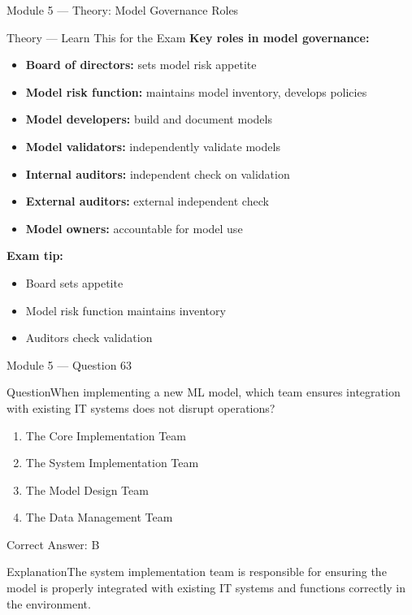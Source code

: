 \documentclass[aspectratio=169,10pt]{beamer}
\newcommand{\question}[1]{\begin{block}{Question}#1\end{block}}
\newcommand{\options}[4]{%
	\begin{enumerate}[label=\Alph*.,leftmargin=*]
		\item #1
		\item #2
		\item #3
		\item #4
	\end{enumerate}
}
\newcommand{\answerbox}[1]{\begin{exampleblock}{Correct Answer: #1}\end{exampleblock}}
\newcommand{\explain}[1]{\begin{block}{Explanation}#1\end{block}}
\newcommand{\theory}[1]{%
	\begin{block}{Theory --- Learn This for the Exam}
		\small #1
	\end{block}
}
\begin{document}
	\begin{frame}{Module 5 --- Theory: Model Governance Roles}
		\theory{
			\textbf{Key roles in model governance:}
			\begin{itemize}
				\item \textbf{Board of directors:} sets model risk appetite
				\item \textbf{Model risk function:} maintains model inventory, develops policies
				\item \textbf{Model developers:} build and document models
				\item \textbf{Model validators:} independently validate models
				\item \textbf{Internal auditors:} independent check on validation
				\item \textbf{External auditors:} external independent check
				\item \textbf{Model owners:} accountable for model use
			\end{itemize}
			\textbf{Exam tip:}
			\begin{itemize}
				\item Board sets appetite
				\item Model risk function maintains inventory
				\item Auditors check validation
			\end{itemize}
		}
	\end{frame}
	
	\begin{frame}{Module 5 --- Question 63}
		\question{When implementing a new ML model, which team ensures integration with existing IT systems does not disrupt operations?}
		\options{The Core Implementation Team}{The System Implementation Team}{The Model Design Team}{The Data Management Team}
		\answerbox{B}
		\explain{The system implementation team is responsible for ensuring the model is properly integrated with existing IT systems and functions correctly in the environment.}
	\end{frame}
	
\end{document}
